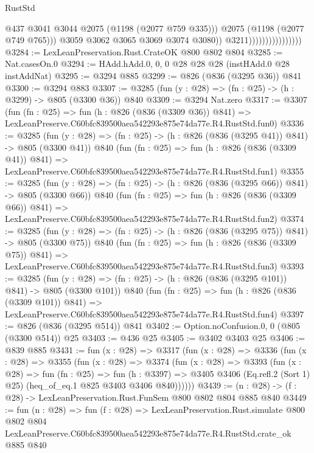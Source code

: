 \begin{lexlean}{RustStd}
\begin{coremodule}
                                            @437
                                            @3041
                                            @3044
                                            @2075
                                            (@1198 (@2077 @759 @335)))
                                          @2075
                                          (@1198 (@2077 @749 @765)))
                                        @3059
                                        @3062
                                        @3065
                                        @3069
                                        @3074
                                        @3080))
                                    @3211))))))))))))))))
@3284 := LexLeanPreservation.Rust.CrateOK @800 @802 @804
@3285 := Nat.casesOn.{0}
@3294 := HAdd.hAdd.{0, 0, 0} @28 @28 @28 (instHAdd.{0} @28 instAddNat)
@3295 := @3294 @885
@3299 := @826 (@836 (@3295 @36)) @841
@3300 := @3294 @883
@3307 := @3285 (fun (y : @28) => (fn : @25) -> (h : @3299) -> @805 (@3300 @36)) @840
@3309 := @3294 Nat.zero
@3317 := @3307
    (fun (fn : @25) =>
    fun (h : @826 (@836 (@3309 @36)) @841) =>
    LexLeanPreserve.C60bfc839500aea542293e875e74da77e.R4.RustStd.fun0)
@3336 := @3285
    (fun (y : @28) => (fn : @25) -> (h : @826 (@836 (@3295 @41)) @841) -> @805 (@3300 @41))
    @840
    (fun (fn : @25) =>
    fun (h : @826 (@836 (@3309 @41)) @841) =>
    LexLeanPreserve.C60bfc839500aea542293e875e74da77e.R4.RustStd.fun1)
@3355 := @3285
    (fun (y : @28) => (fn : @25) -> (h : @826 (@836 (@3295 @66)) @841) -> @805 (@3300 @66))
    @840
    (fun (fn : @25) =>
    fun (h : @826 (@836 (@3309 @66)) @841) =>
    LexLeanPreserve.C60bfc839500aea542293e875e74da77e.R4.RustStd.fun2)
@3374 := @3285
    (fun (y : @28) => (fn : @25) -> (h : @826 (@836 (@3295 @75)) @841) -> @805 (@3300 @75))
    @840
    (fun (fn : @25) =>
    fun (h : @826 (@836 (@3309 @75)) @841) =>
    LexLeanPreserve.C60bfc839500aea542293e875e74da77e.R4.RustStd.fun3)
@3393 := @3285
    (fun (y : @28) => (fn : @25) -> (h : @826 (@836 (@3295 @101)) @841) -> @805 (@3300 @101))
    @840
    (fun (fn : @25) =>
    fun (h : @826 (@836 (@3309 @101)) @841) =>
    LexLeanPreserve.C60bfc839500aea542293e875e74da77e.R4.RustStd.fun4)
@3397 := @826 (@836 (@3295 @514)) @841
@3402 := Option.noConfusion.{0, 0} (@805 (@3300 @514)) @25
@3403 := @436 @25
@3405 := @3402 @3403 @25
@3406 := @839 @885
@3431 := fun (x : @28) =>
  @3317
    (fun (x : @28) =>
    @3336
      (fun (x : @28) =>
      @3355
        (fun (x : @28) =>
        @3374
          (fun (x : @28) =>
          @3393
            (fun (x : @28) =>
            fun (fn : @25) =>
            fun (h : @3397) =>
            @3405 @3406 (Eq.refl.{2} (Sort 1) @25) (heq_of_eq.{1} @825 @3403 @3406 @840))))))
@3439 := (n : @28) -> (f : @28) -> LexLeanPreservation.Rust.FunSem @800 @802 @804 @885 @840
@3449 := fun (n : @28) =>
  fun (f : @28) =>
  LexLeanPreservation.Rust.simulate
    @800
    @802
    @804
    LexLeanPreserve.C60bfc839500aea542293e875e74da77e.R4.RustStd.crate_ok
    @885
    @840
\end{coremodule}
\end{lexlean}

